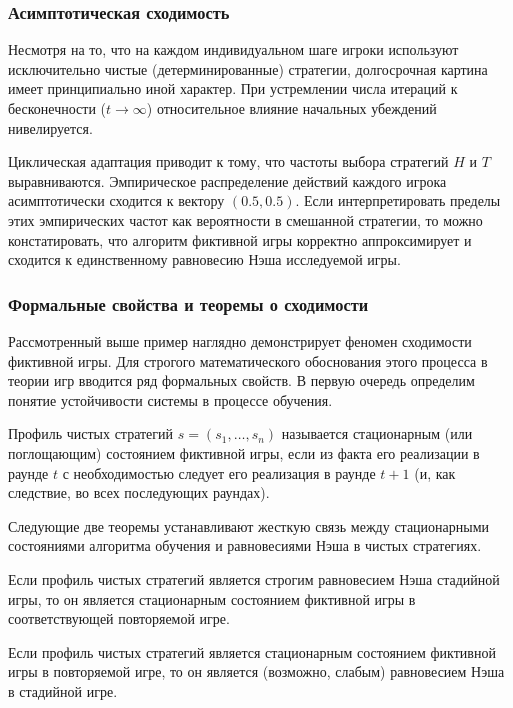 \subsubsection{Асимптотическая сходимость}

Несмотря на то, что на каждом индивидуальном шаге игроки используют исключительно чистые (детерминированные) стратегии, долгосрочная картина имеет принципиально иной характер. При устремлении числа итераций к бесконечности ($t \to \infty$) относительное влияние начальных убеждений нивелируется. 

Циклическая адаптация приводит к тому, что частоты выбора стратегий $H$ и $T$ выравниваются. Эмпирическое распределение действий каждого игрока асимптотически сходится к вектору $(0.5, 0.5)$. Если интерпретировать пределы этих эмпирических частот как вероятности в смешанной стратегии, то можно констатировать, что алгоритм фиктивной игры корректно аппроксимирует и сходится к единственному равновесию Нэша исследуемой игры.

\subsubsection{Формальные свойства и теоремы о сходимости}

Рассмотренный выше пример наглядно демонстрирует феномен сходимости фиктивной игры. Для строгого математического обоснования этого процесса в теории игр вводится ряд формальных свойств. В первую очередь определим понятие устойчивости системы в процессе обучения.

\begin{definition}
Профиль чистых стратегий $s = (s_1, \dots, s_n)$ называется стационарным (или поглощающим) состоянием фиктивной игры, если из факта его реализации в раунде $t$ с необходимостью следует его реализация в раунде $t+1$ (и, как следствие, во всех последующих раундах).
\end{definition}

Следующие две теоремы устанавливают жесткую связь между стационарными состояниями алгоритма обучения и равновесиями Нэша в чистых стратегиях.

\begin{theorem}
Если профиль чистых стратегий является строгим равновесием Нэша стадийной игры, то он является стационарным состоянием фиктивной игры в соответствующей повторяемой игре.
\end{theorem}

\begin{theorem}
Если профиль чистых стратегий является стационарным состоянием фиктивной игры в повторяемой игре, то он является (возможно, слабым) равновесием Нэша в стадийной игре.
\end{theorem}

